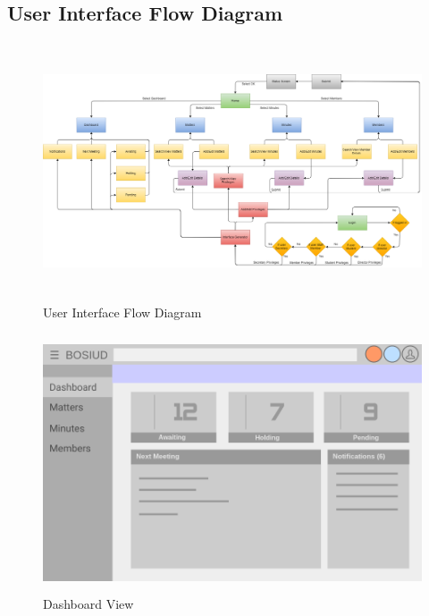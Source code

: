 \documentclass[a4paper,beamer]{article}
\begin{document}
	\subsection{User Interface Flow Diagram}
		\vspace{2cm}
		\begin{figure}[h!]
			\begin{center}
			\includegraphics[width=6in,height=3in]{img/user-interface-flow}
			\end{center}
			\caption{User Interface Flow Diagram}
			\label{fig:user-interface-flow}
		\end{figure}
		\newpage
		
		\vspace{1cm}
		\begin{figure}[h!]
			\begin{center}
			\includegraphics[width=5in,height=3in]{img/ui-dashboard}
			\end{center}
			\caption{Dashboard View}
			\label{fig:ui-dashboard}
		\end{figure}
\end{document}
